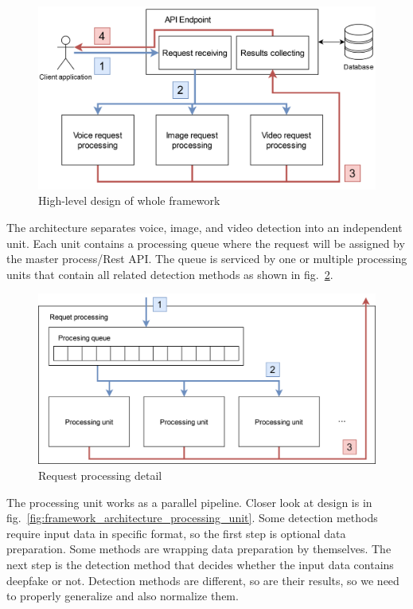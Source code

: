 \begin{figure}[H]
    \centering
    \includegraphics[width=.7\linewidth]{other-fig/framework_architecture.png}
    \caption{High-level design of whole framework}
    \label{fig:framework_architecture}
\end{figure}

The architecture separates voice, image, and video detection into an independent unit. Each unit contains a processing queue where the request will be assigned by the master process/Rest API. The queue is serviced by one or multiple processing units that contain all related detection methods as shown in fig.~\ref{fig:framework_architecture_request_processing}.

\begin{figure}[H]
    \centering
    \includegraphics[width=.65\linewidth]{other-fig/framework_architecture_request_processing.png}
    \caption{Request processing detail}
\label{fig:framework_architecture_request_processing}
\end{figure}

The processing unit works as a parallel pipeline. Closer look at design is in fig.~\ref{fig:framework_architecture_processing_unit}. Some detection methods require input data in specific format, so the first step is optional data preparation. Some methods are wrapping data preparation by themselves. The next step is the detection method that decides whether the input data contains deepfake or not. Detection methods are different, so are their results, so we need to properly generalize and also normalize them.

